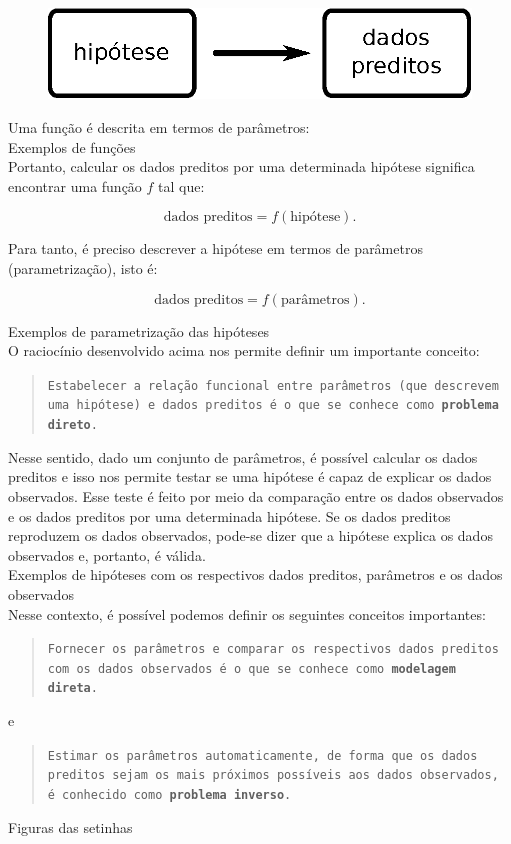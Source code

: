 \begin{figure}[!htb]
  \centering
    \includegraphics[scale=1]{../figs/hipotese-preditos.eps}
  \label{hipotese-preditos}
\end{figure}

Uma função é descrita em termos de parâmetros:
\\
Exemplos de funções
\\
\indent Portanto, calcular os dados preditos por uma determinada hipótese significa
encontrar uma função $f$ tal que:

\[
\text{dados preditos} = f(\text{hipótese}).
\]

\indent Para tanto, é preciso descrever a hipótese em termos de parâmetros
(parametrização), isto é:

\[
\text{dados preditos} = f(\text{parâmetros}).
\]

Exemplos de parametrização das hipóteses
\\
\indent O raciocínio desenvolvido acima nos permite definir um importante conceito:

\begin{quotation}
{\tt Estabelecer a relação funcional entre parâmetros (que descrevem uma hipótese)
e dados preditos é o que se co\-nhe\-ce como {\bf pro\-ble\-ma direto}.}
\end{quotation}

\indent Nesse sentido, dado um conjunto de parâmetros, é possível calcular os dados
preditos e isso nos permite testar se uma hipótese é capaz de explicar os dados
observados. Esse teste é feito por meio da comparação entre os dados observados
e os dados preditos por uma determinada hipótese. Se os dados preditos
reproduzem os dados observados, pode-se dizer que a hipótese explica os dados
observados e, portanto, é válida.
\\
Exemplos de hipóteses com os respectivos dados preditos, parâmetros e os dados observados
\\
\indent Nesse contexto, é possível podemos definir os seguintes conceitos importantes:

\begin{quotation}
{\tt Fornecer os parâmetros e comparar os respectivos dados preditos com os dados
observados é o que se conhece como {\bf mo\-de\-la\-gem direta}.}
\end{quotation}

e

\begin{quotation}
{\tt Estimar os parâmetros automaticamente, de forma que os dados preditos sejam os
mais próximos possíveis aos dados observados, é conhecido como {\bf problema inverso}.}
\end{quotation}

Figuras das setinhas
